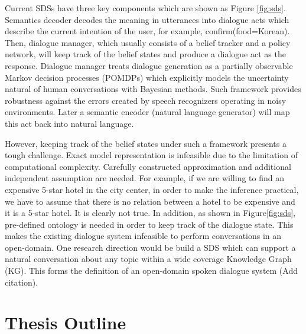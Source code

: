 \documentclass[bsc,frontabs,twoside,singlespacing,parskip,deptreport]{infthesis}     %
\begin{document}
Current SDSs have three key components which are shown as Figure \ref{fig:sds}. Semantics decoder decodes the meaning in utterances into dialogue acts which describe the current intention of the user, for example, confirm(food=Korean). Then, dialogue manager, which usually consists of a belief tracker and a policy network, will keep track of the belief states and produce a dialogue act as the response. Dialogue manager treats dialogue generation as a partially observable Markov decision processes (POMDPs)\cite{williams2007partially,young2013pomdp,young2010hidden} which explicitly models the uncertainty natural of human conversations with Bayesian methods. Such framework provides robustness against the errors created by speech recognizers operating in noisy environments. Later a semantic encoder (natural language generator) will map this act back into natural language.

However, keeping track of the belief states under such a framework presents a tough challenge. Exact model representation is infeasible due to the limitation of computational complexity\cite{young2013pomdp}. Carefully constructed approximation and additional independent assumption are needed. For example, if we are willing to find an expensive 5-star hotel in the city center, in order to make the inference practical, we have to assume that there is no relation between a hotel to be expensive and it is a 5-star hotel. It is clearly not true. In addition, as shown in Figure\ref{fig:sds}, pre-defined ontology is needed in order to keep track of the dialogue state. This makes the existing dialogue system infeasible to perform conversations in an open-domain. One research direction would be build a SDS which can support a natural conversation about any topic within a wide coverage Knowledge Graph (KG). This forms the definition of an open-domain spoken dialogue system (Add citation)\cite{http://mi.eng.cam.ac.uk/research/dialogue/EPSRCProj/stories/desc.html}.


\section {Thesis Outline}
\end{document}

